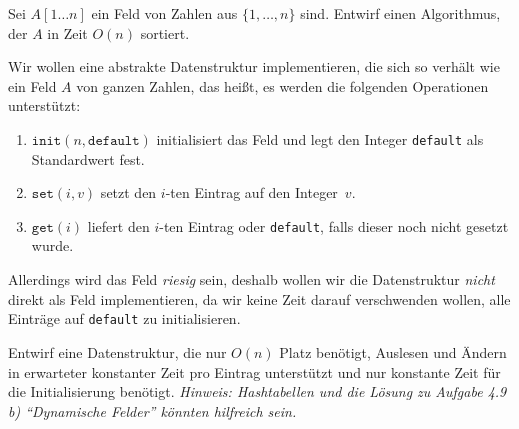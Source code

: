 \documentclass{uebung_cs}
\begin{document}
\begin{aufgabe}%
	Sei $A[1\hdots n]$ ein Feld von Zahlen aus ${\{1, \dots, n\}}$ sind. Entwirf einen Algorithmus, der $A$ in Zeit $O(n)$ sortiert.
\end{aufgabe}

\begin{aufgabe}
	Wir wollen eine abstrakte Datenstruktur implementieren, die sich so verhält wie ein Feld $A$ von ganzen Zahlen, das heißt, es werden die folgenden Operationen unterstützt:
	\begin{enumerate}
		\item $\texttt{init}(n,\texttt{default})$ initialisiert das Feld und legt den Integer \texttt{default} als Standardwert fest.
		\item $\texttt{set}(i,v)$ setzt den $i$-ten Eintrag auf den Integer~$v$.
		\item $\texttt{get}(i)$ liefert den $i$-ten Eintrag oder \texttt{default}, falls dieser noch nicht gesetzt wurde.
	\end{enumerate}
	Allerdings wird das Feld \emph{riesig} sein, deshalb wollen wir die Datenstruktur \emph{nicht} direkt als Feld implementieren, da wir keine Zeit darauf verschwenden wollen, alle Einträge auf \texttt{default} zu initialisieren.

	Entwirf eine Datenstruktur, die nur $O(n)$ Platz benötigt, Auslesen und Ändern in erwarteter konstanter Zeit pro Eintrag unterstützt und nur konstante Zeit für die Initialisierung benötigt.
%
	\emph{Hinweis: Hashtabellen und die Lösung zu Aufgabe 4.9 b) \enquote{Dynamische Felder} könnten hilfreich sein.}
\end{aufgabe}


\end{document}
